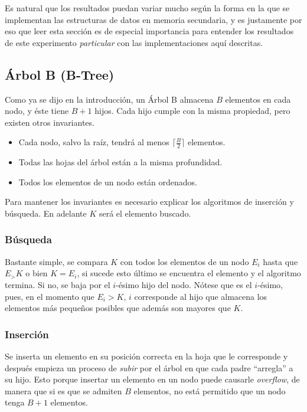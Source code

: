 \documentclass[12pt,letterpaper]{report}
\begin{document}
Es natural que los resultados puedan variar mucho según la forma en la que se implementan las estructuras de datos en memoria secundaria, y es justamente por eso que leer esta sección es de especial importancia para entender los resultados de este experimento \emph{particular} con las implementaciones aquí descritas.

\subsection{Árbol B (B-Tree)}
Como ya se dijo en la introducción, un Árbol B almacena $B$ elementos en cada nodo, y éste tiene $B+1$ hijos. Cada hijo cumple con la misma propiedad, pero existen otros invariantes.

\begin{itemize}
\item Cada nodo, salvo la raíz, tendrá al menos $\lceil \frac{B}{2} \rceil$ elementos.
\item Todas las hojas del árbol están a la misma profundidad.
\item Todos los elementos de un nodo están ordenados.
\end{itemize}

Para mantener los invariantes es necesario explicar los algoritmos de inserción y búsqueda. En adelante $K$ será el elemento buscado.

\subsubsection{Búsqueda}
Bastante simple, se compara $K$ con todos los elementos de un nodo $E_i$ hasta que $E_ > K$ o bien $K = E_i$, si sucede esto último se encuentra el elemento y el algoritmo termina. Si no, se baja por el $i$-ésimo hijo del nodo. Nótese que es el $i$-ésimo, pues, en el momento que $E_i > K$, $i$ corresponde al hijo que almacena los elementos más pequeños posibles que además son mayores que $K$.

\subsubsection{Inserción}
Se inserta un elemento en su posición correcta en la hoja que le corresponde y después empieza un proceso de \emph{subir} por el árbol en que cada padre ``arregla'' a su hijo. Esto porque insertar un elemento en un nodo puede causarle \emph{overflow}, de manera que si es que se admiten $B$ elementos, no está permitido que un nodo tenga $B+1$ elementos.\\
\end{document}

